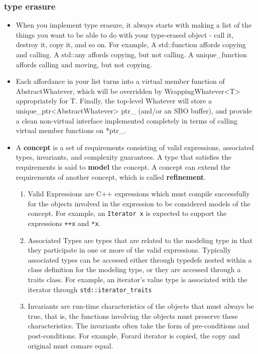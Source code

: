 \documentclass[a4paper,11pt,twoside]{book}
\begin{document}
\subsubsection{type erasure}
\begin{itemize}
\item When you implement type erasure, it always starts with making a list of the things you want to be able to do with your type-erased object - call it, destroy it, copy it, and so on. For example, A std::function affords copying and calling. A std::any affords copying, but not calling. A unique\_function affords calling and moving, but not copying.

\item Each affordance in your list turns into a virtual member function of AbstractWhatever, which will be overridden by WrappingWhatever<T> appropriately for T. Finally, the top-level Whatever will store a unique\_ptr<AbstractWhatever> ptr\_ (and/or an SBO buffer), and provide a clean non-virtual interface implemented completely in terms of calling virtual member functions on *ptr\_.

\item A \textbf{concept} is a set of requirements consisting of valid expressions, associated types, invariants, and complexity guarantees. A type that satisfies the requirements is said to \textbf{model} the concept. A concept can extend the requirements of another concept, which is called \textbf{refinement}.
\begin{enumerate}
	\item Valid Expressions are C++ expressions which must compile successfully for the objects involved in the expression to be considered models of the concept. For example, an \texttt{Iterator x} is expected to support the expressions \texttt{++x} and \texttt{*x}.

	\item Associated Types are types that are related to the modeling type in that they participate in one or more of the valid expressions. Typically associated types can be accessed either through typedefs nested within a class definition for the modeling type, or they are accessed through a traits class. For example, an iterator's value type is associated with the iterator through \texttt{std::iterator\_traits}

	\item Invariants are run-time characteristics of the objects that must always be true, that is, the functions involving the objects must preserve these characteristics. The invariants often take the form of pre-conditions and post-conditions. For example, Forard iterator is copied, the copy and original must comare equal.
	

\end{enumerate}
\end{itemize}
\end{document}

